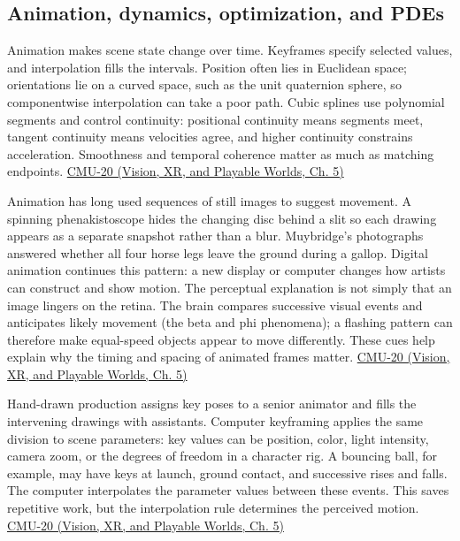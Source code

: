 \subsection{Animation, dynamics, optimization, and PDEs}\label{04-visual-computing-ii-ch029-animation-dynamics-optimization-and-pdes}

\hypertarget{04-visual-computing-ii-ch029-animation-dynamics-optimization-and-pdes}{}

Animation makes scene state change over time. Keyframes specify selected values, and interpolation fills the intervals. Position often lies in Euclidean space; orientations lie on a curved space, such as the unit quaternion sphere, so componentwise interpolation can take a poor path. Cubic splines use polynomial segments and control continuity: positional continuity means segments meet, tangent continuity means velocities agree, and higher continuity constrains acceleration. Smoothness and temporal coherence matter as much as matching endpoints. \href{../07-Vision-XR-and-Playable-Worlds/main.pdf\#nameddest=04-visual-computing-ii-ch036-cmu-20---introduction-to-animation}{CMU-20 (Vision, XR, and Playable Worlds, Ch. 5)}

Animation has long used sequences of still images to suggest movement. A spinning phenakistoscope hides the changing disc behind a slit so each drawing appears as a separate snapshot rather than a blur. Muybridge's photographs answered whether all four horse legs leave the ground during a gallop. Digital animation continues this pattern: a new display or computer changes how artists can construct and show motion. The perceptual explanation is not simply that an image lingers on the retina. The brain compares successive visual events and anticipates likely movement (the beta and phi phenomena); a flashing pattern can therefore make equal-speed objects appear to move differently. These cues help explain why the timing and spacing of animated frames matter. \href{../07-Vision-XR-and-Playable-Worlds/main.pdf\#nameddest=04-visual-computing-ii-ch036-cmu-20---introduction-to-animation}{CMU-20 (Vision, XR, and Playable Worlds, Ch. 5)}

Hand-drawn production assigns key poses to a senior animator and fills the intervening drawings with assistants. Computer keyframing applies the same division to scene parameters: key values can be position, color, light intensity, camera zoom, or the degrees of freedom in a character rig. A bouncing ball, for example, may have keys at launch, ground contact, and successive rises and falls. The computer interpolates the parameter values between these events. This saves repetitive work, but the interpolation rule determines the perceived motion. \href{../07-Vision-XR-and-Playable-Worlds/main.pdf\#nameddest=04-visual-computing-ii-ch036-cmu-20---introduction-to-animation}{CMU-20 (Vision, XR, and Playable Worlds, Ch. 5)}

